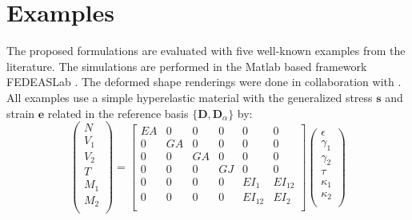 \hypertarget{examples}{%
\section{Examples}\label{sec:examples}}

The proposed formulations are evaluated with five well-known  examples from the literature.
The simulations
are performed in the Matlab based framework FEDEASLab \citep{filippou2004fedeaslabb}.
The deformed shape renderings
were done in collaboration with \cite{vouvakismanousakis2023opensees_model_generator,perez2023veux}.
All examples use %
a simple %
hyperelastic material
with %
the generalized stress \(\boldsymbol{s}\) and  strain \(\boldsymbol{e}\)
related in the reference basis $\{\mathbf{D}, \mathbf{D}_\alpha\}$
by:
\[
\left(\begin{array}{c}
N   \\
V_1 \\
V_2 \\
T   \\
M_1 \\
M_2 \\
\end{array}\right)=\left[\begin{array}{cccccc}
E A & 0 & 0 & 0 & 0 & 0 \\
0 & G {A} & 0 & 0 & 0 & 0 \\
0 & 0 & G {A} & 0 & 0 & 0 \\
0 & 0 & 0 & G J & 0 & 0 \\
0 & 0 & 0 & 0 & E I_{1} & E I_{12} \\
0 & 0 & 0 & 0 & E I_{12} & E I_{2} \\
\end{array}\right]\left(\begin{array}{c}
\epsilon \\
\gamma_1 \\
\gamma_2 \\
\tau \\
\kappa_1 \\
\kappa_2 \\
\end{array}\right)
\]
